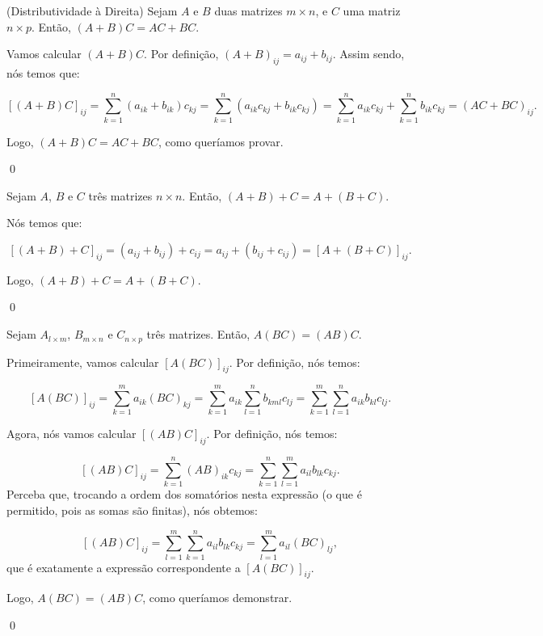 \begin{Proposition}(Distributividade à Direita)
	Sejam $A$ e $B$ duas matrizes $m\times n$, e $C$ uma matriz $n\times p$. Então, $(A + B)C = AC + BC$.
\end{Proposition}

\begin{Proof}
	Vamos calcular $(A + B)C$. Por definição, $(A + B)_{ij} = a_{ij} + b_{ij}$. Assim sendo, nós temos que:
	
	$$
	[(A + B)C]_{ij} = \sum\limits_{k = 1}^n (a_{ik} + b_{ik})c_{kj} = \sum\limits_{k = 1}^{n} (a_{ik}c_{kj} + b_{ik}c_{kj}) = \sum\limits_{k = 1}^{n} a_{ik}c_{kj} + \sum\limits_{k = 1}^{n} b_{ik}c_{kj} = (AC + BC)_{ij}.
	$$
	
	Logo, $(A + B)C = AC + BC$, como queríamos provar.
	
	\qed
\end{Proof}

\begin{Proposition}
	Sejam $A$, $B$ e $C$ três matrizes $n\times n$. Então, $(A + B) + C = A + (B + C)$.
\end{Proposition}

\begin{Proof}
	Nós temos que:
	
	$$
	[(A + B) + C]_{ij} = (a_{ij} + b_{ij}) + c_{ij} = a_{ij} + (b_{ij} + c_{ij}) = [A + (B + C)]_{ij}.
	$$
	
	Logo, $(A + B) + C = A + (B + C)$.
	
	\qed
\end{Proof}

\begin{Proposition}
	Sejam $A_{l\times m}$, $B_{m\times n}$ e $C_{n\times p}$ três matrizes. Então, $A(BC) = (AB)C$.  
\end{Proposition}

\begin{Proof}
	Primeiramente, vamos calcular $[A(BC)]_{ij}$. Por definição, nós temos:
	
	$$
	[A(BC)]_{ij} = \sum\limits_{k = 1}^{m} a_{ik} (BC)_{kj} = \sum\limits_{k = 1}^{m} a_{ik} \sum\limits_{l = 1}^{n} b_{km
	l}c_{lj} = \sum\limits_{k = 1}^{m}\sum\limits_{l = 1}^{n} a_{ik}b_{kl}c_{lj}.
	$$
	
	Agora, nós vamos calcular $[(AB)C]_{ij}$. Por definição, nós temos:
	
	$$
	[(AB)C]_{ij} = \sum\limits_{k = 1}^{n} (AB)_{ik} c_{kj} = \sum\limits_{k = 1}^{n}\sum\limits_{l = 1}^{m} a_{il}b_{lk}c_{kj}.
	$$
	Perceba que, trocando a ordem dos somatórios nesta expressão (o que é permitido, pois as somas são finitas), nós obtemos:
	
	$$
	[(AB)C]_{ij} = \sum\limits_{l = 1}^{m}\sum\limits_{k = 1}^{n} a_{il}b_{lk}c_{kj} = \sum\limits_{l = 1}^{m} a_{il} (BC)_{lj},
	$$
	que é exatamente a expressão correspondente a $[A(BC)]_{ij}$.
	
	Logo, $A(BC) = (AB)C$, como queríamos demonstrar.
	
	\qed
\end{Proof}

